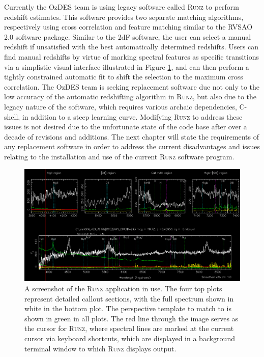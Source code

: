 \documentclass[titlesmallcaps, examinerscopy, copyrightpage]{uqthesis}
\newcommand{\runz}{\textsc{Runz}}
\begin{document}
Currently the OzDES team is using legacy software called \runz{} to perform redshift estimates. This software provides two separate matching algorithms, respectively using cross correlation and feature matching similar to the RVSAO 2.0 software package. Similar to the 2dF software, the user can select a manual redshift if unsatisfied with the best automatically determined redshifts. Users can find manual redshifts by virtue of marking spectral features as specific transitions via a simplistic visual interface illustrated in Figure \ref{fig:runz}, and can then perform a tightly constrained  automatic fit to shift the selection to the maximum cross correlation. The OzDES team is seeking replacement software due not only to the low accuracy of the automatic redshifting algorithm in \runz{}, but also due to the legacy nature of the software, which requires various archaic dependencies, C-shell, in addition to a steep learning curve. Modifying \runz{} to address these issues is not desired due to the unfortunate state of the code base after over a decade of revisions and additions. The next chapter will state the requirements of any replacement software in order to address the current disadvantages and issues relating to the installation and use of the current \runz{} software program.

\begin{figure}[ht!]
\includegraphics[width=1\textwidth]{images/RunzScreen.PNG} 
\centering
\caption{A screenshot of the \runz{} application in use. The four top plots represent detailed callout sections, with the full spectrum shown in white in the bottom plot. The perspective template to match to is shown in green in all plots. The red line through the image serves as the cursor for \runz{}, where spectral lines are marked at the current cursor via keyboard shortcuts, which are displayed in a background terminal window to which \runz{} displays output.}
\label{fig:runz}
\end{figure}
\end{document}
